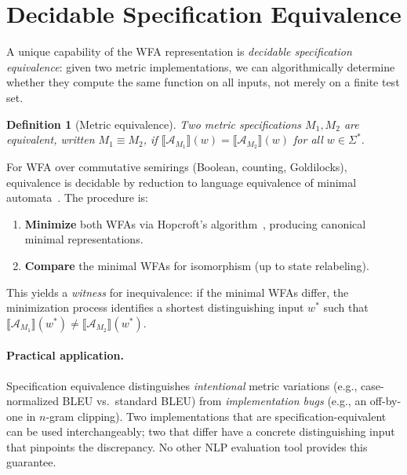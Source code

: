 \documentclass[11pt]{article}
\newtheorem{definition}[theorem]{Definition}
\newcommand{\wfa}{\mathcal{A}}
\begin{document}
\section{Decidable Specification Equivalence}\label{sec:equiv}

A unique capability of the WFA representation is \emph{decidable
specification equivalence}: given two metric implementations, we can
algorithmically determine whether they compute the same function on all
inputs, not merely on a finite test set.

\begin{definition}[Metric equivalence]
Two metric specifications $M_1, M_2$ are \emph{equivalent}, written
$M_1 \equiv M_2$, if
$\llbracket \wfa_{M_1} \rrbracket(w) = \llbracket \wfa_{M_2} \rrbracket(w)$
for all $w \in \Sigma^*$.
\end{definition}

For WFA over commutative semirings (Boolean, counting, Goldilocks),
equivalence is decidable by reduction to language equivalence of
minimal automata~\cite{schutzenberger1961,berstel2011noncommutative}.
The procedure is:

\begin{enumerate}[nosep]
\item \textbf{Minimize} both WFAs via Hopcroft's
  algorithm~\cite{hopcroft1971minimization}, producing canonical
  minimal representations.
\item \textbf{Compare} the minimal WFAs for isomorphism (up to state
  relabeling).
\end{enumerate}

\noindent This yields a \emph{witness} for inequivalence: if the
minimal WFAs differ, the minimization process identifies a
shortest distinguishing input $w^*$ such that
$\llbracket \wfa_{M_1} \rrbracket(w^*) \neq \llbracket \wfa_{M_2} \rrbracket(w^*)$.

\paragraph{Practical application.}
Specification equivalence distinguishes \emph{intentional} metric
variations (e.g., case-normalized BLEU vs.\ standard BLEU) from
\emph{implementation bugs} (e.g., an off-by-one in $n$-gram clipping).
Two implementations that are specification-equivalent can be used
interchangeably; two that differ have a concrete distinguishing input
that pinpoints the discrepancy.  No other NLP evaluation tool provides
this guarantee.
\end{document}

